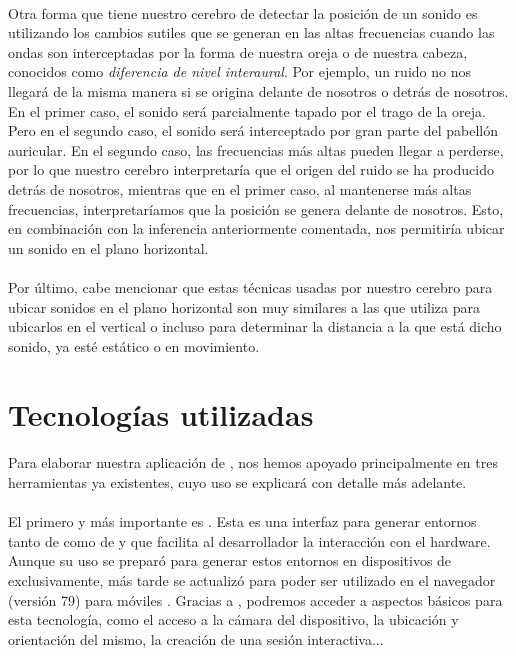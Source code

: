 \documentclass{subfiles}
\begin{document}
        \paragraph{}
        Otra forma que tiene nuestro cerebro de detectar la posición de un sonido es utilizando los cambios sutiles que se generan en las altas frecuencias cuando las ondas son interceptadas por la forma de nuestra oreja o de nuestra cabeza, conocidos como \textit{diferencia de nivel interaural}. Por ejemplo, un ruido no nos llegará de la misma manera si se origina delante de nosotros o detrás de nosotros. En el primer caso, el sonido será parcialmente tapado por el trago de la oreja. Pero en el segundo caso, el sonido será interceptado por gran parte del pabellón auricular. En el segundo caso, las frecuencias más altas pueden llegar a perderse, por lo que nuestro cerebro interpretaría que el origen del ruido se ha producido detrás de nosotros, mientras que en el primer caso, al mantenerse más altas frecuencias, interpretaríamos que la posición se genera delante de nosotros. Esto, en combinación con la inferencia anteriormente comentada, nos permitiría ubicar un sonido en el plano horizontal.

        \paragraph{}
        Por último, cabe mencionar que estas técnicas usadas por nuestro cerebro para ubicar sonidos en el plano horizontal son muy similares a las que utiliza para ubicarlos en el vertical o incluso para determinar la distancia a la que está dicho sonido, ya esté estático o en movimiento.
        
        \section{Tecnologías utilizadas}
        \label{sec:tecnologias_utilizadas}

        Para elaborar nuestra aplicación de \ra, nos hemos apoyado principalmente en tres herramientas ya existentes, cuyo uso se explicará con detalle más adelante.

        \paragraph{}
        El primero y más importante es \webxr \cite{web:webxr}. Esta es una interfaz para generar entornos tanto de \ra como de \rv y que facilita al desarrollador la interacción con el hardware. Aunque su uso se preparó para generar estos entornos en dispositivos de \rv exclusivamente, más tarde se actualizó para poder ser utilizado en el navegador \googlechrome (versión 79) para móviles \android. Gracias a \webxr, podremos acceder a aspectos básicos para esta tecnología, como el acceso a la cámara del dispositivo, la ubicación y orientación del mismo, la creación de una sesión interactiva...
\end{document}
